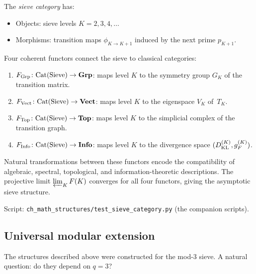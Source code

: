 \documentclass[12pt,a4paper]{article}
\begin{document}
\begin{definition}
\label{def:sieve_category}
The \emph{sieve category} has:
\begin{itemize}[nosep]
\item Objects: sieve levels $K = 2, 3, 4, \ldots$
\item Morphisms: transition maps $\phi_{K \to K+1}$ induced by
  the next prime $p_{K+1}$.
\end{itemize}
\end{definition}

Four coherent functors connect the sieve to classical categories:
\begin{enumerate}[nosep]
\item $F_{\rm Grp}\colon \mathrm{Cat}(\mathrm{Sieve}) \to \mathbf{Grp}$:
  maps level $K$ to the symmetry group $G_K$ of the transition matrix.
\item $F_{\rm Vect}\colon \mathrm{Cat}(\mathrm{Sieve}) \to \mathbf{Vect}$:
  maps level $K$ to the eigenspace $V_K$ of~$T_K$.
\item $F_{\rm Top}\colon \mathrm{Cat}(\mathrm{Sieve}) \to \mathbf{Top}$:
  maps level $K$ to the simplicial complex of the transition graph.
\item $F_{\rm Info}\colon \mathrm{Cat}(\mathrm{Sieve}) \to \mathbf{Info}$:
  maps level $K$ to the divergence space $(D_{\rm KL}^{(K)}, g_F^{(K)})$.
\end{enumerate}

Natural transformations between these functors encode the
compatibility of algebraic, spectral, topological, and
information-theoretic descriptions. The projective limit
$\varprojlim_K F(K)$ converges for all four functors, giving
the asymptotic sieve structure.

Script: \texttt{ch\_math\_structures/test\_sieve\_category.py} (the companion scripts).


\subsection{Universal modular extension}
\label{sec:ms_modular}

The structures described above were constructed for the mod-3
sieve. A natural question: do they depend on $q = 3$?
\end{document}
